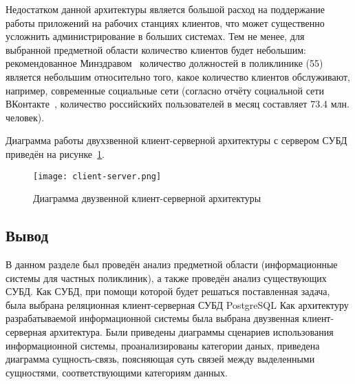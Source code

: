 Недостатком данной архитектуры является большой расход на поддержание работы приложений на рабочих станциях клиентов, что может существенно усложнить администрирование в больших системах.
Тем не менее, для выбранной предметной области количество клиентов будет небольшим: рекомендованное Минздравом~\cite{minsdrav-state} количество должностей в поликлинике (55) является небольшим относительно того, какое количество клиентов обслуживают, например, современные социальные сети (согласно отчёту социальной сети ВКонтакте~\cite{vk-results}, количество российскийх пользователей в месяц составляет 73.4 млн. человек).

Диаграмма работы двухзвенной клиент-серверной архитектуры с сервером СУБД приведён на рисунке~\ref{fig:client-server}.


\begin{figure}[h!]
	\centering
	\captionsetup{justification=centering}
	\texttt{[image: client-server.png]}
	\caption{Диаграмма двузвенной клиент-серверной архитектуры}
	\label{fig:client-server}
\end{figure}

\subsection*{Вывод}
В данном разделе был проведён анализ предметной области (информационные системы для частных поликлиник), а также проведён анализ существующих СУБД. 
Как СУБД, при помощи которой будет решаться поставленная задача, была выбрана реляционная клиент-серверная СУБД PostgreSQL
Как архитектуру разрабатываемой информационной системы была выбрана двузвенная клиент-серверная архитектура. 
Были приведены диаграммы сценариев использования информационной системы, проанализированы категории даных, приведена диаграмма сущность-связь, поясняющая суть связей между выделенными сущностями, соответствующими категориям данных.


